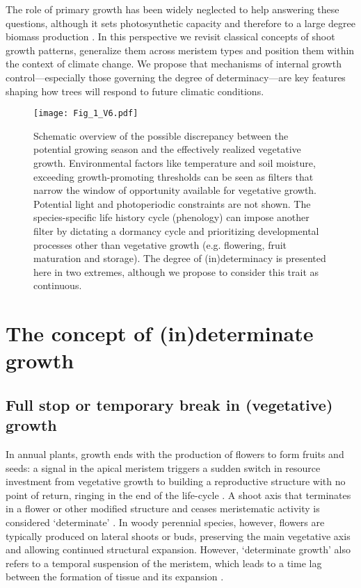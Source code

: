 \documentclass{article}
\begin{document}
		The role of primary growth has been widely neglected to help answering these questions, although it sets photosynthetic capacity and therefore to a large degree biomass production \citep{girardPolycyclismFundamentalTree2011}. 
		In this perspective we revisit classical concepts of shoot growth patterns, generalize them across meristem types and position them within the context of climate change. We propose that mechanisms of internal growth control---especially those governing the degree of determinacy---are key features shaping how trees will respond to future climatic conditions.
		
								\begin{figure}
								\centering
								\texttt{[image: Fig\_1\_V6.pdf]} 
								\caption{Schematic overview of the possible discrepancy between the potential growing season and the effectively realized vegetative growth. Environmental factors like temperature and soil moisture, exceeding growth-promoting thresholds can be seen as filters that narrow the window of opportunity available for vegetative growth. Potential light and photoperiodic constraints are not shown. The species-specific life history cycle (phenology) can impose another filter by dictating a dormancy cycle and prioritizing developmental processes other than vegetative growth (e.g. flowering, fruit maturation and storage). The degree of (in)determinacy is presented here in two extremes, although we propose to consider this trait as continuous.}
								\label{fig:fig_1xxx}
								\end{figure}
								
\section*{The concept of (in)determinate growth}

	\subsection*{Full stop or temporary break in (vegetative) growth}
	In annual plants, growth ends with the production of flowers to form fruits and seeds: a signal in the apical meristem triggers a sudden switch in resource investment from vegetative growth to building a reproductive structure with no point of return, ringing in the end of the life-cycle \citep{poethigPhaseChangeRegulation2003, huijserControlDevelopmentalPhase2011}. A shoot axis that terminates in a flower or other modified structure and ceases meristematic activity is considered `determinate' \citep{barthelemyPlantArchitectureDynamic2007}. In woody perennial species, however, flowers are typically produced on lateral shoots or buds, preserving the main vegetative axis and allowing continued structural expansion. However, `determinate growth' also refers to a temporal suspension of the meristem, which leads to a time lag between the formation of tissue and its expansion \citep{kozlowskiSeedGerminationOntogeny2012, halleTropicalTreesForests1978}. 
	
\end{document}
